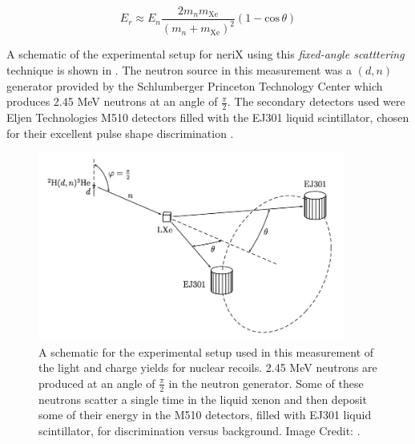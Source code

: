 \begin{equation}
        \label{eqn:nerix_energy_scattering_angle}
        E_r \approx E_n \frac{2 m_n m_{\textrm{Xe}}}{(m_n + m_{\textrm{Xe}})^2}(1 - \textrm{cos} \, \theta)
\end{equation}

A schematic of the experimental setup for neriX using this \textit{fixed-angle scatttering} technique is shown in .  The neutron source in this measurement was a $(d, n)$ generator provided by the Schlumberger Princeton Technology Center which produces 2.45 MeV neutrons at an angle of $\frac{\pi}{2}$.  The secondary detectors used were Eljen Technologies M510 detectors filled with the EJ301 liquid scintillator, chosen for their excellent pulse shape discrimination \cite{ej301_manual}.  


\begin{figure}[t]
        \centering
	\includegraphics[width=0.9\textwidth]{nerix_expt_schematic}
	\caption{A schematic for the experimental setup used in this measurement of the light and charge yields for nuclear recoils.  2.45 MeV neutrons are produced at an angle of $\frac{\pi}{2}$ in the neutron generator.  Some of these neutrons scatter a single time in the liquid xenon and then deposit some of their energy in the M510 detectors, filled with EJ301 liquid scintillator, for discrimination versus background.  Image Credit: .}
	\label{fig:nerix_expt_schematic}
\end{figure}


